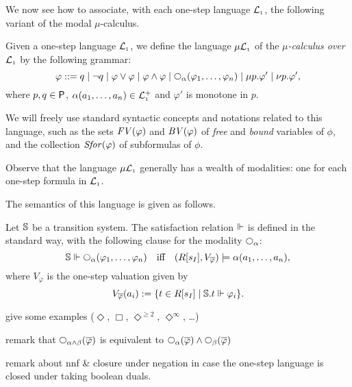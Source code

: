 We now see how to associate, with each one-step language $\mathcal{L}_{\scriptscriptstyle 1}$, the following
variant of the modal $\mu$-calculus.

\begin{definition}
Given a one-step language $\mathcal{L}_{\scriptscriptstyle 1}$, we define the language $\mu\mathcal{L}_{\scriptscriptstyle 1}$ of the 
\emph{$\mu$-calculus over $\mathcal{L}_{\scriptscriptstyle 1}$}  by the following grammar:
\[
\varphi ::= 
   q \mid \neg q 
   \mid \varphi\lor\varphi \mid \varphi\land\varphi 
   \mid \nxt{\al}(\varphi_{1},\ldots,\varphi_{n})
   \mid \mu p. \varphi'    \mid \nu p. \varphi',
\]
where $p,q \in\mathsf{P}$, $\alpha(a_{1},\ldots,a_{n}) \in \mathcal{L}_{\scriptscriptstyle 1}^{+}$ and $\varphi'$ 
is monotone in $p$.

We will freely use standard syntactic concepts and notations related to this 
language, such as the sets $\mathit{FV}(\varphi)$ and $\mathit{BV}(\varphi)$ of \emph{free} and 
\emph{bound} variables of $\phi$, and the collection $\mathit{Sfor}(\varphi)$ of subformulas
of $\phi$.
\end{definition}

Observe that the language $\mu\mathcal{L}_{\scriptscriptstyle 1}$ generally has a wealth of modalities:
one for each one-step formula in $\mathcal{L}_{\scriptscriptstyle 1}$.

The semantics of this language is given as follows.

\begin{definition}
Let $\mathbb{S}$ be a transition system.
The satisfaction relation $\Vdash$ is defined in the standard way, with the 
following clause for the modality $\nxt{\alpha}$:
$$
\model \mmodels \nxt{\al}(\varphi_{1},\ldots,\varphi_{n})
\quad\text{iff}\quad 
(R[s_{I}],V_{\overline{\varphi}}) \models \al(a_{1},\ldots,a_{n}),
$$
where $V_{\overline{\varphi}}$ is the one-step valuation given by 
\[
V_{\overline{\varphi}}(a_{i}) \mathrel{:=} 
  \{ t \in R[s_{I}] \mid \mathbb{S}.t \Vdash \varphi_{i}\}.
\]
\end{definition}

% 

\btbs
\item
give some examples ($\Diamond$, $\Box$, $\Diamond^{\geq 2}$, 
$\Diamond^{\infty}$, \ldots)
\item
remark that $\nxt{\alpha\land\beta}(\ol{\phi})$ is equivalent to
$\nxt{\alpha}(\ol{\phi}) \land \nxt{\beta}(\ol{\phi})$
\item
remark about nnf \& closure under negation in case the one-step 
language is closed under taking boolean duals.
\etbs

